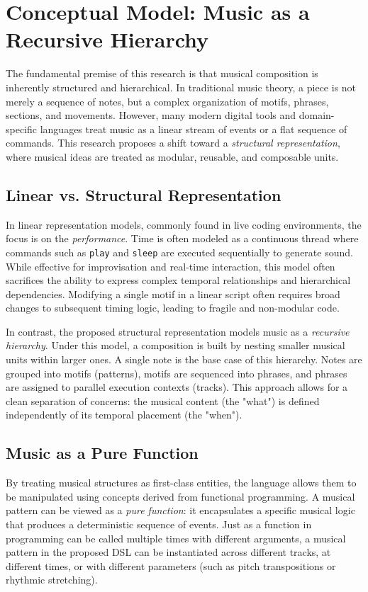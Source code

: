\section{Conceptual Model: Music as a Recursive Hierarchy}\label{sec:conceptual-model}

The fundamental premise of this research is that musical composition is inherently structured and hierarchical.
In traditional music theory, a piece is not merely a sequence of notes, but a complex organization of motifs,
phrases, sections, and movements.
However, many modern digital tools and domain-specific languages treat music as a linear stream of events or
a flat sequence of commands.
This research proposes a shift toward a \textit{structural representation}, where musical ideas are treated
as modular, reusable, and composable units.

\subsection{Linear vs. Structural Representation}

In linear representation models, commonly found in live coding environments, the focus is on the \textit{performance}.
Time is often modeled as a continuous thread where commands such as \texttt{play} and \texttt{sleep} are
executed sequentially to generate sound.
While effective for improvisation and real-time interaction, this model often sacrifices the ability to
express complex temporal relationships and hierarchical dependencies.
Modifying a single motif in a linear script often requires broad changes to subsequent timing logic, leading
to fragile and non-modular code.

In contrast, the proposed structural representation models music as a \textit{recursive hierarchy}.
Under this model, a composition is built by nesting smaller musical units within larger ones.
A single note is the base case of this hierarchy.
Notes are grouped into motifs (patterns), motifs are sequenced into phrases, and phrases are assigned to
parallel execution contexts (tracks).
This approach allows for a clean separation of concerns: the musical content (the "what") is defined
independently of its temporal placement (the "when").

\subsection{Music as a Pure Function}

By treating musical structures as first-class entities, the language allows them to be manipulated using
concepts derived from functional programming.
A musical pattern can be viewed as a \textit{pure function}: it encapsulates a specific musical logic that
produces a deterministic sequence of events.
Just as a function in programming can be called multiple times with different arguments, a musical pattern in
the proposed DSL can be instantiated across different tracks, at different times, or with different
parameters (such as pitch transpositions or rhythmic stretching).

